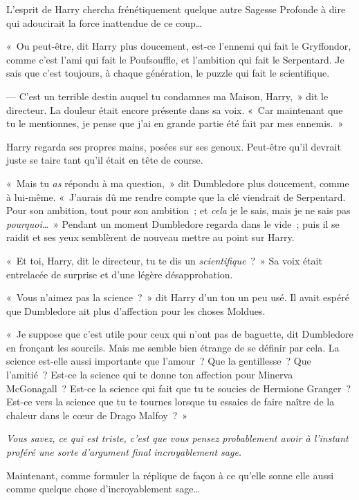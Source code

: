 L'esprit de Harry chercha frénétiquement quelque autre Sagesse Profonde à dire qui adoucirait la force inattendue de ce coup…

«~Ou peut-être, dit Harry plus doucement, est-ce l'ennemi qui fait le Gryffondor, comme c'est l'ami qui fait le Poufsouffle, et l'ambition qui fait le Serpentard.
Je sais que c'est toujours, à chaque génération, le puzzle qui fait le scientifique.

--- C'est un terrible destin auquel tu condamnes ma Maison, Harry,~» dit le directeur.
La douleur était encore présente dans sa voix.
«~Car maintenant que tu le mentionnes, je pense que j'ai en grande partie été fait par mes ennemis.~»

Harry regarda ses propres mains, posées sur ses genoux.
Peut-être qu'il devrait juste se taire tant qu'il était en tête de course.

«~Mais tu \emph{as} répondu à ma question,~» dit Dumbledore plus doucement, comme à lui-même.
«~J'aurais dû me rendre compte que la clé viendrait de Serpentard.
Pour son ambition, tout pour son ambition~; et \emph{cela} je le sais, mais je ne sais pas \emph{pourquoi}…~»
Pendant un moment Dumbledore regarda dans le vide~; puis il se raidit et ses yeux semblèrent de nouveau mettre au point sur Harry.

«~Et toi, Harry, dit le directeur, tu te dis un \emph{scientifique}~?~»
Sa voix était entrelacée de surprise et d'une légère désapprobation.

«~Vous n'aimez pas la science~?~»
dit Harry d'un ton un peu usé.
Il avait espéré que Dumbledore ait plus d'affection pour les choses Moldues.

«~Je suppose que c'est utile pour ceux qui n'ont pas de baguette, dit Dumbledore en fronçant les sourcils.
Mais me semble bien étrange de se définir par cela.
La science est-elle aussi importante que l'amour~?
Que la gentillesse~?
Que l'amitié~?
Est-ce la science qui te donne ton affection pour Minerva McGonagall~?
Est-ce la science qui fait que tu te soucies de Hermione Granger~?
Est-ce vers la science que tu te tournes lorsque tu essaies de faire naître de la chaleur dans le cœur de Drago Malfoy~?~»

\emph{Vous savez, ce qui est triste, c'est que vous pensez probablement avoir à l'instant proféré une sorte d'argument final incroyablement sage.}

Maintenant, comme formuler la réplique de façon à ce qu'elle sonne elle aussi comme quelque chose d'incroyablement sage…

